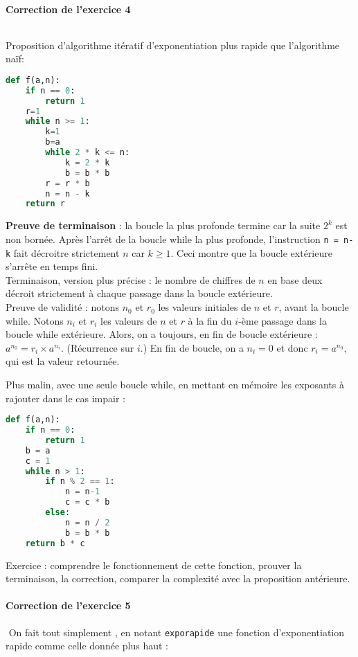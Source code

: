 \documentclass[11pt,a4paper]{article}
\begin{document}
\paragraph{Correction de l'exercice 4 }$ $

Proposition d'algorithme itératif d'exponentiation plus rapide que l'algorithme naïf: 
\begin{lstlisting}[language=Python]
def f(a,n):
	if n == 0:
		return 1
	r=1
	while n >= 1:
		k=1
		b=a
		while 2 * k <= n:
			k = 2 * k
			b = b * b
		r = r * b
		n = n - k
	return r
\end{lstlisting}

\textbf{Preuve de terminaison} : la boucle la plus profonde termine car la suite $2^k$ est non bornée.
Après l'arrêt de la boucle while la plus profonde, l'instruction \verb+n = n-k+ fait décroitre strictement $n$ car $k\geq 1$. Ceci montre que la boucle extérieure s'arrête en temps fini.\\
Terminaison, version plus précise : le nombre de chiffres de $n$ en base deux décroit strictement à chaque passage dans la boucle extérieure.\\

Preuve de validité : notons $n_0$ et $r_0$ les valeurs initiales de $n$ et $r$, avant la boucle while. Notons $n_i$ et $r_i$ les valeurs de $n$ et $r$ à la fin du $i$-ème passage dans la boucle while extérieure.
Alors, on a toujours, en fin de boucle extérieure : $a^{n_0} = r_i \times a^{n_i}$. (Récurrence sur $i$.)
En fin de boucle, on a $n_i = 0$ et donc $r_i= a^{n_0}$, qui est la valeur retournée.

Plus malin, avec une seule boucle while, en mettant en mémoire les exposants à rajouter dans le cas impair : 
\begin{lstlisting}[language=Python]
def f(a,n):
	if n == 0:
		return 1
	b = a
	c = 1
	while n > 1:
		if n % 2 == 1:
			n = n-1
			c = c * b
		else:
			n = n / 2
			b = b * b
	return b * c
\end{lstlisting}

Exercice : comprendre le fonctionnement de cette fonction, prouver la terminaison, la correction, comparer la complexité avec la proposition antérieure.



\paragraph{Correction de l'exercice 5 }$ $
On fait tout simplement , en notant \verb+exporapide+ une fonction d'exponentiation rapide comme celle donnée plus haut : 
\end{document}

